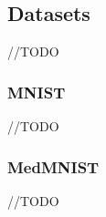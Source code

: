 \subsection{Datasets}\label{datasets}
//TODO

\subsubsection{MNIST}\label{mnist}
//TODO

\subsubsection{MedMNIST}\label{medmnist}
//TODO